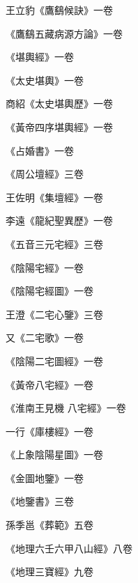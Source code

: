 \begin{pinyinscope}
 王立豹《鷹鷂候訣》一卷



 《鷹鷂五藏病源方論》一卷



 《堪輿經》一卷



 《太史堪輿》一卷



 商紹《太史堪輿歷》一卷



 《黃帝四序堪輿經》一卷



 《占婚書》一卷



 《周公壇經》三卷



 王佐明《集壇經》一卷



 李遠《龍紀聖異歷》一卷



 《五音三元宅經》三卷



 《陰陽宅經》一卷



 《陰陽宅經圖》一卷



 王澄《二宅心鑒》三卷



 又《二宅歌》一卷



 《陰陽二宅圖經》一卷



 《黃帝八宅經》一卷



 《淮南王見機
 八宅經》一卷



 一行《庫樓經》一卷



 《上象陰陽星圖》一卷



 《金圖地鑒》一卷



 《地鑒書》三卷



 孫季邕《葬範》五卷



 《地理六壬六甲八山經》八卷



 《地理三寶經》九卷




\end{pinyinscope}
